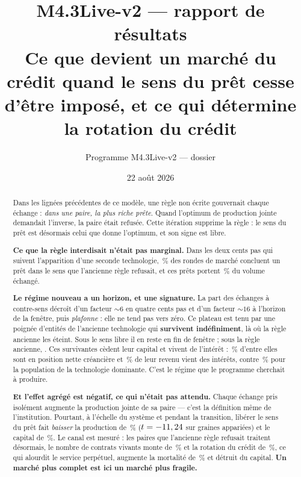 \documentclass[11pt,a4paper]{article}
\title{M4.3Live-v2 --- rapport de résultats\\
\large Ce que devient un marché du crédit quand le sens du prêt cesse d'être
imposé, et ce qui détermine la rotation du crédit}
\author{Programme M4.3Live-v2 --- dossier \code{m4\_3live\_v2\_credit\_soc}}
\date{22 août 2026}
\begin{document}
\maketitle

\begin{abstract}
Dans les lignées précédentes de ce modèle, une règle non écrite gouvernait
chaque échange : \emph{dans une paire, la plus riche prête}. Quand l'optimum de
production jointe demandait l'inverse, la paire était refusée. Cette itération
supprime la règle : le sens du prêt est désormais celui que donne l'optimum,
et son signe est libre.

\textbf{Ce que la règle interdisait n'était pas marginal.} Dans les deux cents
pas qui suivent l'apparition d'une seconde technologie,
\pctReversalAhcentCinquanteTransition\,\% des rondes de marché concluent un
prêt dans le sens que l'ancienne règle refusait, et ces prêts portent
\pctVolumeRevAhcentCinquanteTransition\,\% du volume échangé.

\textbf{Le régime nouveau a un horizon, et une signature.} La part des
échanges à contre-sens décroît d'un facteur $\sim 6$ en quatre cents pas et
d'un facteur $\sim 16$ à l'horizon de la fenêtre, puis \emph{plafonne} : elle
ne tend pas vers zéro. Ce plateau est tenu par une
poignée d'entités de l'ancienne technologie qui \textbf{survivent
indéfiniment}, là où la règle ancienne les éteint. Sous le sens libre il en
reste \techZeroFreeAhcentCinquanteResiduel{} en fin de fenêtre ; sous la règle
ancienne, \techZeroVoneAhcentCinquanteResiduel{}. Ces survivantes cèdent leur
capital et vivent de l'intérêt : \survFreeOldCreditor\,\% d'entre elles sont en
position nette créancière et \survFreeOldInterest\,\% de leur revenu vient des
intérêts, contre \survFreeNewInterest\,\% pour la population de la technologie
dominante. C'est le régime que le programme cherchait à produire.

\textbf{Et l'effet agrégé est négatif, ce qui n'était pas attendu.} Chaque
échange pris isolément augmente la production jointe de sa paire --- c'est la
définition même de l'institution. Pourtant, à l'échelle du système et pendant
la transition, libérer le sens du prêt fait \emph{baisser} la production de
\diffProdAhcentCinquanteTransition\,\% ($t = -11,24$
sur \nSeeds{} graines appariées) et le capital de
\diffKtotAhcentCinquanteTransition\,\%. Le canal est mesuré : les paires que
l'ancienne règle refusait traitent désormais, le nombre de contrats vivants
monte de \diffNLoansAhcentCinquanteTransition\,\% et la rotation du crédit de
\diffRotAhcentCinquanteTransition\,\%, ce qui alourdit le service perpétuel,
augmente la mortalité de \diffMortAhcentCinquanteTransition\,\% et détruit du
capital. \textbf{Un marché plus complet est ici un marché plus fragile.}


\end{abstract}
\end{document}
